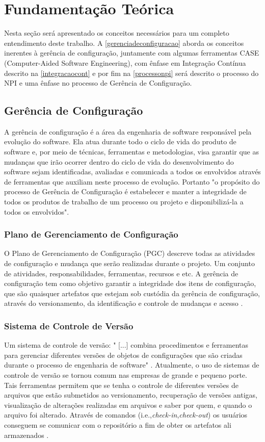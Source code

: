 \chapter{Fundamentação Teórica}\label{fundamentacao}
Nesta seção será apresentado os conceitos necessários para um completo entendimento deste trabalho. A \autoref{gerenciadeconfiguracao} aborda os conceitos inerentes à gerência de configuração, juntamente com algumas ferramentas CASE (Computer-Aided Software Engineering), com ênfase em Integração Contínua descrito na \autoref{integracaocont} e por fim na \autoref{processonpi} será descrito o processo do NPI e uma ênfase no processo de Gerência de Configuração.

\section{Gerência de Configuração}\label{gerenciadeconfiguracao}
A gerência de configuração é a área da engenharia de software responsável pela evolução do software. Ela atua durante todo o ciclo de vida do produto de software e, por meio de técnicas, ferramentas e metodologias, visa garantir que as mudanças que irão ocorrer dentro do ciclo de vida do desenvolvimento do software sejam identificadas, avaliadas e comunicada a todos os envolvidos através de ferramentas que auxiliam neste processo de evolução.
Portanto "o propósito do processo de Gerência de Configuração é estabelecer e manter a integridade de todos os produtos de trabalho de um processo ou projeto e disponibilizá-la a todos os envolvidos"\space\cite{mpsbr}.
\subsection{Plano de Gerenciamento de Configuração}\label{pgc}
O Plano de Gerenciamento de Configuração (PGC) descreve todas as atividades de configuração e mudança que serão realizadas durante o projeto. Um conjunto de atividades, responsabilidades, ferramentas, recursos e etc. A gerência de configuração tem como objetivo garantir a integridade dos itens de configuração, que são quaisquer artefatos que estejam sob custódia da gerência de configuração, através do versionamento, da identificação e controle de mudanças e acesso \cite{pressman2010}. 

\subsection{Sistema de Controle de Versão}
Um sistema de controle de versão: "	[...] combina procedimentos e ferramentas para gerenciar diferentes versões de objetos de configurações que são criadas durante o processo de engenharia de software" \cite[p.~927]{pressman2010}.
Atualmente, o uso de sistemas de controle de versão se tornou comum nas empresas de grande e pequeno porte. Tais ferramentas permitem que se tenha o controle de diferentes versões de arquivos que estão submetidos ao versionamento, recuperação de versões antigas, visualização de alterações realizadas em arquivos e saber por quem, e quando o arquivo foi alterado. Através de comandos (i.e.,\textit{check-in},\textit{check-out}) os usuários conseguem se comunicar com o repositório a fim de obter os artefatos ali armazenados \cite{gleiph2011}.

